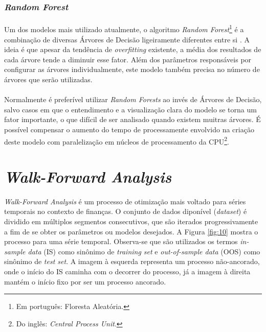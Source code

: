 \subsubsection*{\textit{Random Forest}}

\paragraph{} Um dos modelos mais utilizado atualmente, o algoritmo \textit{Random Forest}\footnote{Em português: Floresta Aleatória.} é a combinação de diversas Árvores de Decisão ligeiramente diferentes entre si \cite{muller2016introduction}. A ideia é que apesar da tendência de \textit{overfitting} existente, a média dos resultados de cada árvore tende a diminuir esse fator. Além dos parâmetros responsáveis por configurar as árvores individualmente, este modelo também precisa no número de árvores que serão utilizadas.

\paragraph{} Normalmente é preferível utilizar \textit{Random Forests} ao invés de Árvores de Decisão, salvo casos em que o entendimento e a visualização clara do modelo se torna um fator importante, o que difícil de ser analisado quando existem muitras árvores. É possível compensar o aumento do tempo de processamente envolvido na criação deste modelo com paralelização em núcleos de processamento da CPU\footnote{Do inglês: \textit{Central Process Unit}.}.



\section{\textit{Walk-Forward Analysis}}

\paragraph{} \textit{Walk-Forward Analysis} \cite{pardo2011evaluation} é um processo de otimização mais voltado para séries temporais no contexto de finanças. O conjunto de dados diponível (\textit{dataset}) é dividido em múltiplos segmentos consecutivos, que são iterados progressivamente a fim de se obter os parâmetros ou modelos desejados. A Figura \ref{fig:10} mostra o processo para uma série temporal. Observa-se que são utilizados os termos \textit{in-sample data} (IS) como sinônimo de \textit{training set} e \textit{out-of-sample data} (OOS) como sinônimo de \textit{test set}. A imagem à esquerda representa um processo não-ancorado, onde o início do IS caminha com o decorrer do processo, já a imagem à direita mantém o início fixo por ser um processo ancorado.

